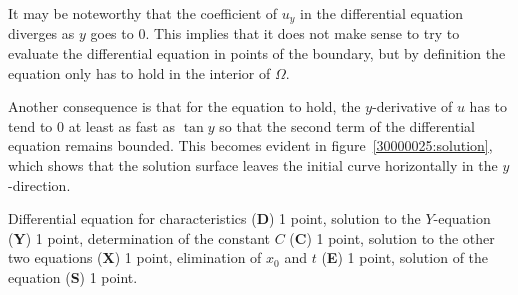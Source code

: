 \begin{diskussion}
It may be noteworthy that the coefficient of $u_y$ in the differential
equation diverges as $y$ goes to $0$.
This implies that it does not make sense to try to evaluate the
differential equation in points of the boundary, but by definition
the equation only has to hold in the interior of $\Omega$.

Another consequence is that for the equation to hold, the $y$-derivative
of $u$ has to tend to $0$ at least as fast as $\tan y$ so that the
second term of the differential equation remains bounded.
This becomes evident in figure~\ref{30000025:solution}, which shows that
the solution surface leaves the initial curve horizontally in the
$y$-direction.
\end{diskussion}

\begin{bewertung}
Differential equation for characteristics ({\bf D}) 1 point,
solution to the $Y$-equation ({\bf Y}) 1 point,
determination of the constant $C$ ({\bf C}) 1 point,
solution to the other two equations ({\bf X}) 1 point,
elimination of $x_0$ and $t$ ({\bf E}) 1 point,
solution of the equation ({\bf S}) 1 point.
\end{bewertung}
